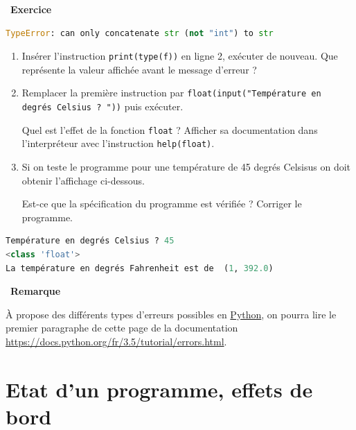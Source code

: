 \documentclass[
  11pt,
]{article}
\newcommand{\passthrough}[1]{#1}
\newcounter{exo}
\newenvironment{exercice}[1]
{\par \medskip   \addtocounter{exo}{1} \noindent  
\begin{bclogo}[arrondi =0.1,   noborder = true, logo=\bccrayon, marge=4]{~\textbf{Exercice} \textbf{\theexo} {\itshape #1} }  \par}
{
\end{bclogo}
 \par \bigskip }
\newcounter{prop}
\newcounter{rque}
\newenvironment{remarque}
{\par \medskip    \addtocounter{rque}{1} \noindent  
\begin{bclogo}[arrondi =0.1,  ombre = true, barre=snake, noborder = true, logo=\bcinfo, marge=0]{~\textbf{Remarque} \textbf{\therque}}  \par }
{
\end{bclogo}
 \par \bigskip }
\newcounter{def}
\newcounter{prog}
\begin{document}
\begin{exercice}{}
\begin{lstlisting}[language=Python]
TypeError: can only concatenate str (not "int") to str
\end{lstlisting}

\begin{enumerate}
\def\labelenumi{\arabic{enumi}.}
\setcounter{enumi}{3}
\item
  Insérer l'instruction \passthrough{\lstinline!print(type(f))!} en
  ligne 2, exécuter de nouveau. Que représente la valeur affichée avant
  le message d'erreur ?
\item
  Remplacer la première instruction par
  \passthrough{\lstinline!float(input("Température en degrés Celsius ? "))!}
  puis exécuter.

  Quel est l'effet de la fonction \passthrough{\lstinline!float!} ?
  Afficher sa documentation dans l'interpréteur avec l'instruction
  \passthrough{\lstinline!help(float)!}.
\item
  Si on teste le programme pour une température de 45 degrés Celsisus on
  doit obtenir l'affichage ci-dessous.

  Est-ce que la spécification du programme est vérifiée ? Corriger le
  programme.
\end{enumerate}

\begin{lstlisting}[language=Python]
Température en degrés Celsius ? 45
<class 'float'>
La température en degrés Fahrenheit est de  (1, 392.0)
\end{lstlisting}

\end{exercice}

\begin{remarque}{}

À propose des différents types d'erreurs possibles en
\href{https://docs.python.org/3/tutorial/datastructures.html}{Python},
on pourra lire le premier paragraphe de cette page de la documentation
\url{https://docs.python.org/fr/3.5/tutorial/errors.html}.

\end{remarque}

\hypertarget{etat-dun-programme-effets-de-bord}{%
\section{Etat d'un programme, effets de
bord}\label{etat-dun-programme-effets-de-bord}}
\end{document}
